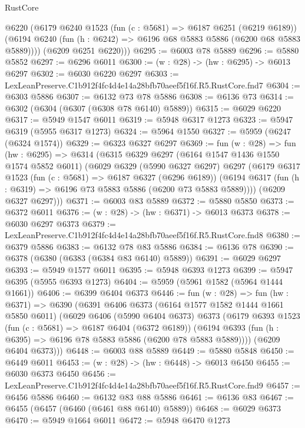 \begin{lexlean}{RustCore}
\begin{coremodule}
        @6220
        (@6179
          @6240
          @1523
          (fun (c : @5681) => @6187 @6251 (@6219 @6189))
          (@6194 @6240 (fun (h : @6242) => @6196 @68 @5883 @5886 (@6200 @68 @5883 @5889))))
        (@6209 @6251 @6220)))
@6295 := @6003 @78 @5889
@6296 := @5880 @5852
@6297 := @6296 @6011
@6300 := (w : @28) -> (hw : @6295) -> @6013 @6297
@6302 := @6030 @6220 @6297
@6303 := LexLeanPreserve.C1b912f4fc4d4e14a28bfb70aeef5f16f.R5.RustCore.fnd7
@6304 := @6303 @5886
@6307 := @6132 @73 @78 @5886
@6308 := @6136 @73
@6314 := @6302 (@6304 (@6307 (@6308 @78 @6140) @5889))
@6315 := @6029 @6220
@6317 := @5949 @1547 @6011
@6319 := @5948 @6317 @1273
@6323 := @5947 @6319 (@5955 @6317 @1273)
@6324 := @5964 @1550
@6327 := @5959 (@6247 (@6324 @1574))
@6329 := @6323 @6327 @6297
@6369 := fun (w : @28) =>
  fun (hw : @6295) =>
  @6314
    (@6315
      @6329
      @6297
      (@6164 @1547 @1436 @1550 @1574 @5852 @6011)
      (@6029
        @6329
        (@5990 @6327 @6297)
        @6297
        (@6179
          @6317
          @1523
          (fun (c : @5681) => @6187 @6327 (@6296 @6189))
          (@6194 @6317 (fun (h : @6319) => @6196 @73 @5883 @5886 (@6200 @73 @5883 @5889))))
        (@6209 @6327 @6297)))
@6371 := @6003 @83 @5889
@6372 := @5880 @5850
@6373 := @6372 @6011
@6376 := (w : @28) -> (hw : @6371) -> @6013 @6373
@6378 := @6030 @6297 @6373
@6379 := LexLeanPreserve.C1b912f4fc4d4e14a28bfb70aeef5f16f.R5.RustCore.fnd8
@6380 := @6379 @5886
@6383 := @6132 @78 @83 @5886
@6384 := @6136 @78
@6390 := @6378 (@6380 (@6383 (@6384 @83 @6140) @5889))
@6391 := @6029 @6297
@6393 := @5949 @1577 @6011
@6395 := @5948 @6393 @1273
@6399 := @5947 @6395 (@5955 @6393 @1273)
@6404 := @5959 (@5961 @1582 (@5964 @1444 @1661))
@6406 := @6399 @6404 @6373
@6446 := fun (w : @28) =>
  fun (hw : @6371) =>
  @6390
    (@6391
      @6406
      @6373
      (@6164 @1577 @1582 @1444 @1661 @5850 @6011)
      (@6029
        @6406
        (@5990 @6404 @6373)
        @6373
        (@6179
          @6393
          @1523
          (fun (c : @5681) => @6187 @6404 (@6372 @6189))
          (@6194 @6393 (fun (h : @6395) => @6196 @78 @5883 @5886 (@6200 @78 @5883 @5889))))
        (@6209 @6404 @6373)))
@6448 := @6003 @88 @5889
@6449 := @5880 @5848
@6450 := @6449 @6011
@6453 := (w : @28) -> (hw : @6448) -> @6013 @6450
@6455 := @6030 @6373 @6450
@6456 := LexLeanPreserve.C1b912f4fc4d4e14a28bfb70aeef5f16f.R5.RustCore.fnd9
@6457 := @6456 @5886
@6460 := @6132 @83 @88 @5886
@6461 := @6136 @83
@6467 := @6455 (@6457 (@6460 (@6461 @88 @6140) @5889))
@6468 := @6029 @6373
@6470 := @5949 @1664 @6011
@6472 := @5948 @6470 @1273

\end{coremodule}
\end{lexlean}
